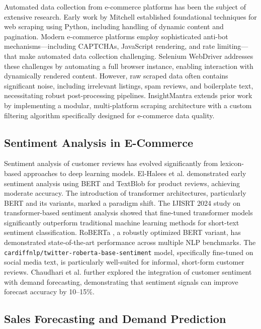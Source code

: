 \documentclass[conference]{IEEEtran}
\begin{document}
Automated data collection from e-commerce platforms has been the subject of extensive research. Early work by Mitchell \cite{b2} established foundational techniques for web scraping using Python, including handling of dynamic content and pagination. Modern e-commerce platforms employ sophisticated anti-bot mechanisms---including CAPTCHAs, JavaScript rendering, and rate limiting---that make automated data collection challenging. Selenium WebDriver \cite{b3} addresses these challenges by automating a full browser instance, enabling interaction with dynamically rendered content. However, raw scraped data often contains significant noise, including irrelevant listings, spam reviews, and boilerplate text, necessitating robust post-processing pipelines. InsightMantra extends prior work by implementing a modular, multi-platform scraping architecture with a custom filtering algorithm specifically designed for e-commerce data quality.

\subsection{Sentiment Analysis in E-Commerce}

Sentiment analysis of customer reviews has evolved significantly from lexicon-based approaches to deep learning models. El-Halees et al. \cite{b4} demonstrated early sentiment analysis using BERT and TextBlob for product reviews, achieving moderate accuracy. The introduction of transformer architectures, particularly BERT \cite{b5} and its variants, marked a paradigm shift. The IJISRT 2024 study on transformer-based sentiment analysis \cite{b6} showed that fine-tuned transformer models significantly outperform traditional machine learning methods for short-text sentiment classification. RoBERTa \cite{b7}, a robustly optimized BERT variant, has demonstrated state-of-the-art performance across multiple NLP benchmarks. The \texttt{cardiffnlp/twitter-roberta-base-sentiment} model, specifically fine-tuned on social media text, is particularly well-suited for informal, short-form customer reviews. Chaudhari et al. \cite{b8} further explored the integration of customer sentiment with demand forecasting, demonstrating that sentiment signals can improve forecast accuracy by 10--15\%.

\subsection{Sales Forecasting and Demand Prediction}
\end{document}
